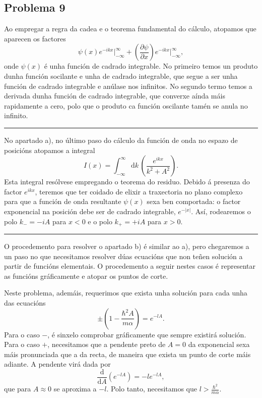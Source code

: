 \documentclass[a4paper,12pt]{article}
\begin{document}
\subsection*{Problema 9}

Ao empregar a regra da cadea e o teorema fundamental do cálculo, atopamos que aparecen os factores
\begin{equation}
	 \psi(x) e^{-ikx} \Big |_{-\infty}^{\infty} + \left(\frac{\partial \psi}{\partial x}\right) e^{-ikx} \Big |_{-\infty}^{\infty},
\end{equation}
\noindent
onde $\psi(x)$ é unha función de cadrado integrable. No primeiro temos un produto dunha función socilante e unha de cadrado integrable, que segue a ser unha función de cadrado integrable e anúlase nos infinitos. No segundo termo temos a derivada dunha función de cadrado integrable, que converxe aínda máis rapidamente a cero, polo que o produto ca función oscilante tamén se anula no infinito.

\begin{center} \hrule \end{center}

No apartado a), no último paso do cálculo da función de onda no espazo de posicións atopamos a integral
\begin{equation}
	I(x) = \int_{-\infty}^\infty \mathrm{d}k \, \left(\frac{e^{ikx}}{k^2 + A^2}\right).
\end{equation}
\noindent
Esta integral resólvese empregando o teorema do residuo. Debido á presenza do factor $e^{ikx}$, teremos que ter coidado de elixir a traxectoria no plano complexo para que a función de onda resultante $\psi(x)$ sexa ben comportada: o factor exponencial na posición debe ser de cadrado integrable, $e^{-|x|}$. Así, rodearemos o polo $k_-=-iA$ para $x<0$ e o polo $k_+=+iA$ para $x>0$.

\begin{center} \hrule \end{center}

O procedemento para resolver o apartado b) é similar ao a), pero chegaremos a un paso no que necesitamos resolver dúas ecuacións que non teñen solución a partir de funcións elementais. O procedemento a seguir nestes casos é representar as funcións gráficamente e atopar os puntos de corte.

Neste problema, ademáis, requerimos que exista unha solución para cada unha das ecuacións
\begin{equation}
	\pm \left(1 - \frac{\hbar^2 A}{m \alpha} \right) = e^{-lA}.
\end{equation}
\noindent
Para o caso $-$, é sinxelo comprobar gráficamente que sempre existirá solución. Para o caso $+$, necesitamos que a pendente preto de $A=0$ da exponencial sexa máis pronunciada que a da recta, de maneira que exista un punto de corte máis adiante. A pendente virá dada por
\begin{equation}
	\frac{\mathrm{d}}{\mathrm{d}A} (e^{-lA}) = -l e^{-lA},
\end{equation}
\noindent
que para $A \approx 0$ se aproxima a $-l$. Polo tanto, necesitamos que $l > \frac{\hbar^2}{m\alpha}$.
\end{document}
